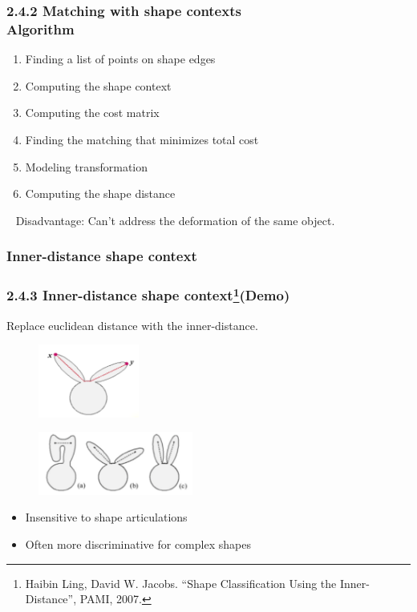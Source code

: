 \documentclass[notheorems,serif,table,compress]{beamer}  %
\begin{document}
\begin{frame}
\frametitle{2.4.2 Matching with shape contexts \\ \normalsize{Algorithm}}
    \begin{enumerate}
        \item Finding a list of points on shape edges
        \item Computing the shape context
        \item Computing the cost matrix
        \item Finding the matching that minimizes total cost
        \item Modeling transformation
        \item Computing the shape distance
    \end{enumerate}
     ~\newline
    Disadvantage: Can't address the deformation of the same object.
\end{frame}


\subsubsection{Inner-distance shape context}
\begin{frame}
\frametitle{2.4.3 Inner-distance shape context\footnote{Haibin Ling, David W. Jacobs. ``Shape Classification Using the Inner-Distance'', PAMI, 2007.}(Demo)}
Replace euclidean distance with the inner-distance.
   \begin{figure}[!ht]
    \centering
    \includegraphics[width=1.3in]{neijuli.png}
   \end{figure}
   \begin{figure}[!ht]
    \centering
    \includegraphics[width=2in]{bijiao.png}
   \end{figure}
      \begin{itemize}
       \item Insensitive to shape articulations
       \item Often more discriminative for complex shapes
   \end{itemize}
\end{frame}
\end{document}
